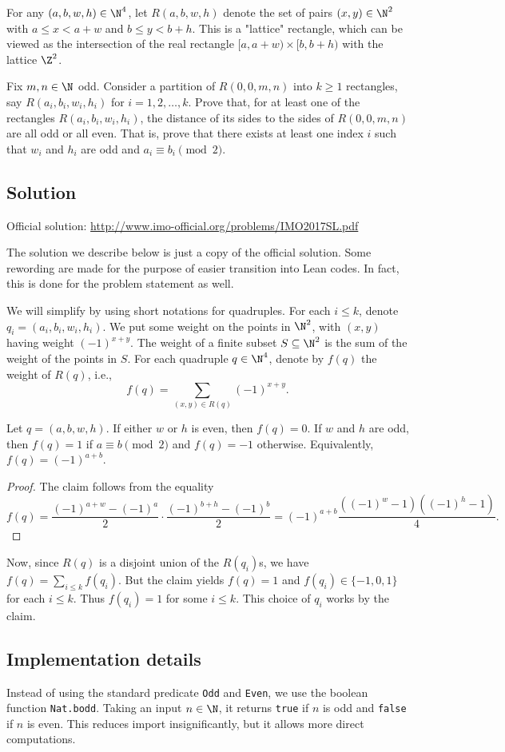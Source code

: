 For any $(a, b, w, h) \in \N^4$, let $R(a, b, w, h)$ denote the set of pairs $(x, y) \in \N^2$ with $a \leq x < a + w$ and $b \leq y < b + h$.
This is a "lattice" rectangle, which can be viewed as the intersection of the real rectangle $[a, a + w) \times [b, b + h)$ with the lattice $\Z^2$.

Fix $m, n \in \N$ odd.
Consider a partition of $R(0, 0, m, n)$ into $k \geq 1$ rectangles, say $R(a_i, b_i, w_i, h_i)$ for $i = 1, 2, \ldots, k$.
Prove that, for at least one of the rectangles $R(a_i, b_i, w_i, h_i)$, the distance of its sides to the sides of $R(0, 0, m, n)$ are all odd or all even.
That is, prove that there exists at least one index $i$ such that $w_i$ and $h_i$ are odd and $a_i \equiv b_i \pmod{2}$.



\subsection*{Solution}

Official solution: \url{http://www.imo-official.org/problems/IMO2017SL.pdf}

The solution we describe below is just a copy of the official solution.
Some rewording are made for the purpose of easier transition into Lean codes.
In fact, this is done for the problem statement as well.

We will simplify by using short notations for quadruples.
For each $i \leq k$, denote $q_i = (a_i, b_i, w_i, h_i)$.
We put some weight on the points in $\N^2$, with $(x, y)$ having weight $(-1)^{x + y}$.
The weight of a finite subset $S \subseteq \N^2$ is the sum of the weight of the points in $S$.
For each quadruple $q \in \N^4$, denote by $f(q)$ the weight of $R(q)$, i.e.,
\[ f(q) = \sum_{(x, y) \in R(q)} (-1)^{x + y}. \]

\begin{claim}
Let $q = (a, b, w, h)$.
If either $w$ or $h$ is even, then $f(q) = 0$.
If $w$ and $h$ are odd, then $f(q) = 1$ if $a \equiv b \pmod{2}$ and $f(q) = -1$ otherwise.
Equivalently, $f(q) = (-1)^{a + b}$.
\end{claim}
\begin{proof}
The claim follows from the equality
\[ f(q) = \frac{(-1)^{a + w} - (-1)^a}{2} \cdot \frac{(-1)^{b + h} - (-1)^b}{2} = (-1)^{a + b}\frac{((-1)^w - 1)((-1)^h - 1)}{4}. \]
\end{proof}

Now, since $R(q)$ is a disjoint union of the $R(q_i)$s, we have $f(q) = \sum_{i \leq k} f(q_i)$.
But the claim yields $f(q) = 1$ and $f(q_i) \in \{-1, 0, 1\}$ for each $i \leq k$.
Thus $f(q_i) = 1$ for some $i \leq k$.
This choice of $q_i$ works by the claim.



\subsection*{Implementation details}

Instead of using the standard predicate \texttt{Odd} and \texttt{Even}, we use the boolean function \texttt{Nat.bodd}.
Taking an input $n \in \N$, it returns \texttt{true} if $n$ is odd and \texttt{false} if $n$ is even.
This reduces import insignificantly, but it allows more direct computations.

